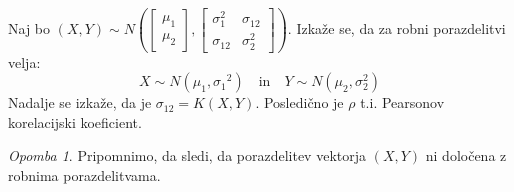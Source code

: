 \documentclass[12pt]{book}
\def\n{\noindent}
\theoremstyle{definition}
\theoremstyle{plain}
\theoremstyle{plain}
\theoremstyle{plain}
\theoremstyle{remark}
\newtheorem*{opomba}{Opomba}
\begin{document}
%        
%        
%
%
%

\n Naj bo $(X,Y) \sim N\left(\begin{bmatrix} \mu_1 \\ \mu_2 \end{bmatrix},\begin{bmatrix} \sigma_1^2 & \sigma_{12} \\ \sigma_{12} & \sigma_2^2 \end{bmatrix}\right)$. Izkaže se, da za robni porazdelitvi velja: 
$$
X \sim N\left(\mu_1, \sigma_1{ }^2\right) \quad \text {in} \quad Y \sim N\left(\mu_2, \sigma_2^2\right)
$$
Nadalje se izkaže, da je $\sigma_{1 2}=K(X, Y)$. Posledično je $\rho$ t.i. Pearsonov korelacijski koeficient. 

\begin{opomba}
    Pripomnimo, da sledi, da porazdelitev vektorja $(X,Y)$ ni določena z robnima porazdelitvama. 
\end{opomba}
\end{document}
